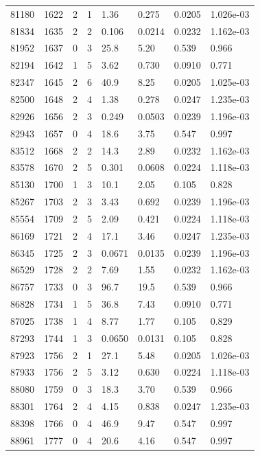 \documentclass[preview]{standalone}
\begin{document}
{{{{{{{{\begin{tabular}{L{1.2cm}C{1.2cm} C{0.3cm}C{0.5cm} C{1.4cm}C{1.4cm} C{1.4cm}C{1.4cm}}
  81180  &  1622  & 2     &  1 &  1.36  & 0.275  & 0.0205 &  1.026e-03   \\ 
  81834  &  1635  & 2     &  2 &  0.106  & 0.0214  & 0.0232 &  1.162e-03   \\ 
  81952  &  1637  & 0     &  3 &  25.8  & 5.20  & 0.539 &  0.966   \\ 
  82194  &  1642  & 1     &  5 &  3.62  & 0.730  & 0.0910 &  0.771   \\ 
  82347  &  1645  & 2     &  6 &  40.9  & 8.25  & 0.0205 &  1.025e-03   \\ 
  82500  &  1648  & 2     &  4 &  1.38  & 0.278  & 0.0247 &  1.235e-03   \\ 
  82926  &  1656  & 2     &  3 &  0.249  & 0.0503  & 0.0239 &  1.196e-03   \\ 
  82943  &  1657  & 0     &  4 &  18.6  & 3.75  & 0.547 &  0.997   \\ 
  83512  &  1668  & 2     &  2 &  14.3  & 2.89  & 0.0232 &  1.162e-03   \\ 
  83578  &  1670  & 2     &  5 &  0.301  & 0.0608  & 0.0224 &  1.118e-03   \\ 
  85130  &  1700  & 1     &  3 &  10.1  & 2.05  & 0.105 &  0.828   \\ 
  85267  &  1703  & 2     &  3 &  3.43  & 0.692  & 0.0239 &  1.196e-03   \\ 
  85554  &  1709  & 2     &  5 &  2.09  & 0.421  & 0.0224 &  1.118e-03   \\ 
  86169  &  1721  & 2     &  4 &  17.1  & 3.46  & 0.0247 &  1.235e-03   \\ 
  86345  &  1725  & 2     &  3 &  0.0671  & 0.0135  & 0.0239 &  1.196e-03   \\ 
  86529  &  1728  & 2     &  2 &  7.69  & 1.55  & 0.0232 &  1.162e-03   \\ 
  86757  &  1733  & 0     &  3 &  96.7  & 19.5  & 0.539 &  0.966   \\ 
  86828  &  1734  & 1     &  5 &  36.8  & 7.43  & 0.0910 &  0.771   \\ 
  87025  &  1738  & 1     &  4 &  8.77  & 1.77  & 0.105 &  0.829   \\ 
  87293  &  1744  & 1     &  3 &  0.0650  & 0.0131  & 0.105 &  0.828   \\ 
  87923  &  1756  & 2     &  1 &  27.1  & 5.48  & 0.0205 &  1.026e-03   \\ 
  87933  &  1756  & 2     &  5 &  3.12  & 0.630  & 0.0224 &  1.118e-03   \\ 
  88080  &  1759  & 0     &  3 &  18.3  & 3.70  & 0.539 &  0.966   \\ 
  88301  &  1764  & 2     &  4 &  4.15  & 0.838  & 0.0247 &  1.235e-03   \\ 
  88398  &  1766  & 0     &  4 &  46.9  & 9.47  & 0.547 &  0.997   \\ 
  88961  &  1777  & 0     &  4 &  20.6  & 4.16  & 0.547 &  0.997   \\ 
\hline 
\end{tabular} 

}}}}}}}}
\end{document}
